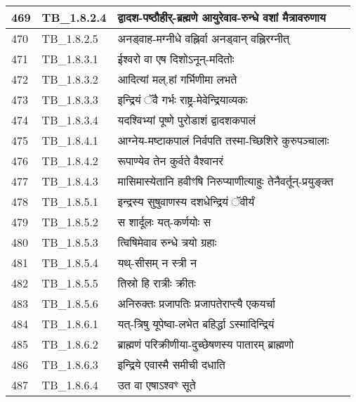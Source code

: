 \documentclass[17pt]{extarticle}
\begin{document}
\begin{longtable}{||p{0.4in}||p{0.9in}||p{4.0in}||p{0.9in}||}
            469 & TB\_1.8.2.4 & द्वादश{-}पष्ठौहीर्{-}ब्रह्मणे आयुरेवाव{-}रुन्धे वशां मैत्रावरुणाय &      \\
        \hline
            470 & TB\_1.8.2.5 & अनड्वाह{-}मग्नीधे वह्निर्वा अनड्वान् वह्निरग्नीत् &      \\
        \hline
            471 & TB\_1.8.3.1 & ईश्वरो वा एष दिशोऽनून्{-}मदितोः &      \\
        \hline
            472 & TB\_1.8.3.2 & आदित्यां मल्.हां गर्भिणीमा लभते &      \\
        \hline
            473 & TB\_1.8.3.3 & इन्द्रियं ॅवै गर्भः राष्ट्र{-}मेवेन्द्रियाव्यकः &      \\
        \hline
            474 & TB\_1.8.3.4 & यदश्विभ्यां पूष्णे पुरोडाशं द्वादशकपालं &      \\
        \hline
            475 & TB\_1.8.4.1 & आग्नेय{-}मष्टाकपालं निर्वपति तस्मा{-}च्छिशिरे कुरुपञ्चालाः &      \\
        \hline
            476 & TB\_1.8.4.2 & रूपाण्येव तेन कुर्वते वैश्वानरं &      \\
        \hline
            477 & TB\_1.8.4.3 & मासिमास्येतानि हवीꣳषि निरुप्याणीत्याहुः तेनैवर्तून्{-}प्रयुङ्क्त &      \\
        \hline
            478 & TB\_1.8.5.1 & इन्द्रस्य सुषुवाणस्य दशधेन्द्रियं ॅवीर्यं &      \\
        \hline
            479 & TB\_1.8.5.2 & स शार्दूलः यत्{-}कर्णयोः स &      \\
        \hline
            480 & TB\_1.8.5.3 & त्विषिमेवाव रुन्धे त्रयो ग्रहाः &      \\
        \hline
            481 & TB\_1.8.5.4 & यथ्{-}सीसम् न स्त्री न &      \\
        \hline
            482 & TB\_1.8.5.5 & तिस्रो हि रात्रीः क्रीतः &      \\
        \hline
            483 & TB\_1.8.5.6 & अनिरुक्तः प्रजापतिः प्रजापतेराप्त्यै एकयर्चा &      \\
        \hline
            484 & TB\_1.8.6.1 & यत्{-}त्रिषु यूपेष्वा{-}लभेत बहिर्द्धा ऽस्मादिन्द्रियं &      \\
        \hline
            485 & TB\_1.8.6.2 & ब्राह्मणं परिक्रीणीया{-}दुच्छेषणस्य पातारम् ब्राह्मणो &      \\
        \hline
            486 & TB\_1.8.6.3 & इन्द्रिये एवास्मै समीची दधाति &      \\
        \hline
            487 & TB\_1.8.6.4 & उत वा एषाऽश्वꣳ सूते &      \\

\end{longtable}
\end{document}
